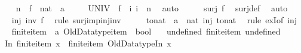\begin{isabellebody}
\ \ \isamarkupfalse%
\ n\ \ f\ {\isacharcolon}{\isacharcolon}\ {\isachardoublequoteopen}nat\ {\isasymRightarrow}\ {\isacharprime}a{\isachardoublequoteclose}\isanewline
\ \ \ \ \ {\isachardoublequoteopen}UNIV\ {\isacharequal}\ f\ {\isacharbackquote}\ {\isacharbraceleft}i{\isachardot}\ i\ {\isacharless}\ n{\isacharbraceright}{\isachardoublequoteclose}\ \isamarkupfalse%
\ auto\isanewline
\ \ \isamarkupfalse%
\ \isamarkupfalse%
\ {\isachardoublequoteopen}surj\ f{\isachardoublequoteclose}\ \isamarkupfalse%
\ surj{\isacharunderscore}def\ \isamarkupfalse%
\ auto\isanewline
\ \ \isamarkupfalse%
\ \isamarkupfalse%
\ {\isachardoublequoteopen}inj\ {\isacharparenleft}inv\ f{\isacharparenright}{\isachardoublequoteclose}\ \isamarkupfalse%
\ {\isacharparenleft}rule\ surj{\isacharunderscore}imp{\isacharunderscore}inj{\isacharunderscore}inv{\isacharparenright}\isanewline
\ \ \isamarkupfalse%
\ \isamarkupfalse%
\ {\isachardoublequoteopen}{\isasymexists}to{\isacharunderscore}nat\ {\isacharcolon}{\isacharcolon}\ {\isacharprime}a\ {\isasymRightarrow}\ nat{\isachardot}\ inj\ to{\isacharunderscore}nat{\isachardoublequoteclose}\ \isamarkupfalse%
\ {\isacharparenleft}rule\ exI{\isacharbrackleft}of\ inj{\isacharbrackright}{\isacharparenright}\isanewline
{}\isamarkupfalse%
%
\endisatagproof
{\isafoldproof}%
%
\isadelimproof
%
\endisadelimproof
%
\isadelimdocument
%
\endisadelimdocument
%
\isatagdocument
%
\isamarkuptrue%
%
\endisatagdocument
{\isafolddocument}%
%
\isadelimdocument
%
\endisadelimdocument
{}\isamarkupfalse%
\isanewline
{}\isanewline
\isanewline
{}\ \isamarkupfalse%
\ finite{\isacharunderscore}item\ {\isacharcolon}{\isacharcolon}\ {\isachardoublequoteopen}{\isacharprime}a\ Old{\isacharunderscore}Datatype{\isachardot}item\ {\isasymRightarrow}\ bool{\isachardoublequoteclose}\ \isanewline
\ \ undefined{\isacharcolon}\ {\isachardoublequoteopen}finite{\isacharunderscore}item\ undefined{\isachardoublequoteclose}\isanewline
{\isacharbar}\ In{}{\isacharcolon}\ {\isachardoublequoteopen}finite{\isacharunderscore}item\ x\ {\isasymLongrightarrow}\ finite{\isacharunderscore}item\ {\isacharparenleft}Old{\isacharunderscore}Datatype{\isachardot}In{}\ x{\isacharparenright}{\isachardoublequoteclose}\isanewline

\end{isabellebody}
